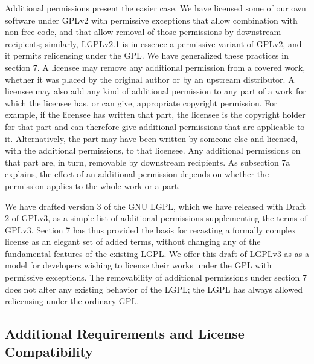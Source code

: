 
Additional permissions present the easier case.  We have licensed some of our
own software under GPLv2 with permissive exceptions that allow combination
with non-free code, and that allow removal of those permissions by downstream
recipients; similarly, LGPLv2.1 is in essence a permissive variant of GPLv2,
and it permits relicensing under the GPL.  We have generalized these
practices in section 7.  A licensee may remove any additional permission from
a covered work, whether it was placed by the original author or by an
upstream distributor.  A licensee may also add any kind of additional
permission to any part of a work for which the licensee has, or can give,
appropriate copyright permission. For example, if the licensee has written
that part, the licensee is the copyright holder for that part and can
therefore give additional permissions that are applicable to it.
Alternatively, the part may have been written by someone else and licensed,
with the additional permissions, to that licensee.  Any additional
permissions on that part are, in turn, removable by downstream recipients.
As subsection 7a explains, the effect of an additional permission depends on
whether the permission applies to the whole work or a part.


We have drafted version 3 of the GNU LGPL, which we have released with Draft
2 of GPLv3, as a simple list of additional permissions supplementing the
terms of GPLv3.  Section 7 has thus provided the basis for recasting a
formally complex license as an elegant set of added terms, without changing
any of the fundamental features of the existing LGPL.  We offer this draft of
LGPLv3 as as a model for developers wishing to license their works under the
GPL with permissive exceptions.  The removability of additional permissions
under section 7 does not alter any existing behavior of the LGPL; the LGPL
has always allowed relicensing under the ordinary GPL.

\subsection{Additional Requirements and License Compatibility}


